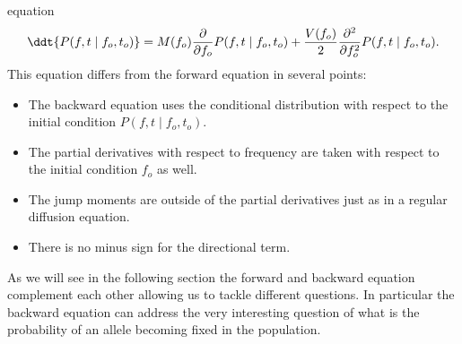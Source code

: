 equation
\begin{equation}
	\ddt{P(f, t \mid f_o, t_o)} =
	M(f_o) {\partial \over \partial f_o}P(f, t \mid f_o, t_o) +
	{V(f_o) \over 2} {\partial^2 \over \partial f_o^2} P(f, t \mid f_o, t_o).
\end{equation}
This equation differs from the forward equation in several points:
\begin{itemize}
	\item The backward equation uses the conditional distribution with respect to
	the initial condition $P(f, t \mid f_o, t_o)$.
	\item The partial derivatives with respect to frequency are taken with respect
	to the initial condition $f_o$ as well.
	\item The jump moments are outside of the partial derivatives just as in a
	regular diffusion equation.
	\item There is no minus sign for the directional term.
\end{itemize}
As we will see in the following section the forward and backward equation
complement each other allowing us to tackle different questions. In particular
the backward equation can address the very interesting question of what is the
probability of an allele becoming fixed in the population.
